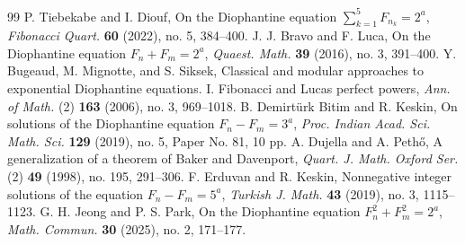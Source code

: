 \documentclass[10pt,a4paper]{amsart}
\begin{document}
\begin{thebibliography}{99}
 P. Tiebekabe and I. Diouf, {On the Diophantine equation $\sum_{k=1}^{5}F_{n_k}=2^a$}, \emph{Fibonacci Quart.} \textbf{60} (2022), no. 5, 384--400.
 J. J. Bravo and F. Luca, {On the Diophantine equation $F_n+F_m=2^a$}, \emph{Quaest. Math.} \textbf{39} (2016), no. 3, 391--400.
 Y. Bugeaud, M. Mignotte, and S. Siksek, {Classical and modular approaches to exponential Diophantine equations. I. Fibonacci and Lucas perfect powers}, \emph{Ann. of Math.} (2) \textbf{163} (2006), no. 3, 969--1018.
 B. Demirt{\"u}rk Bitim and R. Keskin, {On solutions of the Diophantine equation $F_n-F_m=3^a$}, \emph{Proc. Indian Acad. Sci. Math. Sci.} \textbf{129} (2019), no. 5, Paper No. 81, 10 pp.
 A. Dujella and A. Peth{\H{o}}, {A generalization of a theorem of Baker and Davenport}, \emph{Quart. J. Math. Oxford Ser.} (2) \textbf{49} (1998), no. 195, 291--306.
 F. Erduvan and R. Keskin, {Nonnegative integer solutions of the equation $F_n-F_m=5^a$}, \emph{Turkish J. Math.} \textbf{43} (2019), no. 3, 1115--1123.
 G. H. Jeong and P. S. Park, {On the Diophantine equation $F_n^2+F_m^2=2^a$}, \emph{Math. Commun.} \textbf{30} (2025), no. 2, 171--177.
\end{thebibliography}
\end{document}
